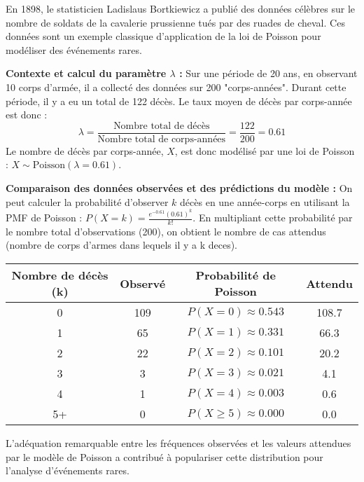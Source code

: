 \begin{examplebox}
En 1898, le statisticien Ladislaus Bortkiewicz a publié des données célèbres sur le nombre de soldats de la cavalerie prussienne tués par des ruades de cheval. Ces données sont un exemple classique d'application de la loi de Poisson pour modéliser des événements rares.

\vspace{0.3cm}
\noindent\textbf{Contexte et calcul du paramètre $\lambda$ :}
\newline
Sur une période de 20 ans, en observant 10 corps d'armée, il a collecté des données sur 200 "corps-années". Durant cette période, il y a eu un total de 122 décès. Le taux moyen de décès par corps-année est donc :
$$ \lambda = \frac{\text{Nombre total de décès}}{\text{Nombre total de corps-années}} = \frac{122}{200} = 0.61 $$
Le nombre de décès par corps-année, $X$, est donc modélisé par une loi de Poisson : $X \sim \text{Poisson}(\lambda=0.61)$.

\vspace{0.3cm}
\noindent\textbf{Comparaison des données observées et des prédictions du modèle :}
\newline
On peut calculer la probabilité d'observer $k$ décès en une année-corps en utilisant la PMF de Poisson : $P(X=k) = \frac{e^{-0.61} (0.61)^k}{k!}$. En multipliant cette probabilité par le nombre total d'observations (200), on obtient le nombre de cas attendus (nombre de corps d'armes dans lequels il y a k deces).

\begin{center}
\begin{tabular}{|c|c|c|c|}
\hline
\textbf{Nombre de décès (k)} & \textbf{Observé} & \textbf{Probabilité de Poisson} & \textbf{Attendu} \\
\hline
0 & 109 & $P(X=0) \approx 0.543$ & 108.7 \\
1 & 65 & $P(X=1) \approx 0.331$ & 66.3 \\
2 & 22 & $P(X=2) \approx 0.101$ & 20.2 \\
3 & 3 & $P(X=3) \approx 0.021$ & 4.1 \\
4 & 1 & $P(X=4) \approx 0.003$ & 0.6 \\
5+ & 0 & $P(X \ge 5) \approx 0.000$ & 0.0 \\
\hline
\end{tabular}
\end{center}

\vspace{0.3cm}
L'adéquation remarquable entre les fréquences observées et les valeurs attendues par le modèle de Poisson a contribué à populariser cette distribution pour l'analyse d'événements rares.
\end{examplebox}


